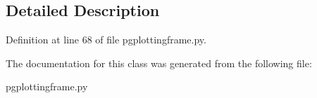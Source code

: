 \subsection{Detailed Description}


Definition at line 68 of file pgplottingframe.\+py.



The documentation for this class was generated from the following file\+:\begin{DoxyCompactItemize}
\item 
pgplottingframe.\+py\end{DoxyCompactItemize}
